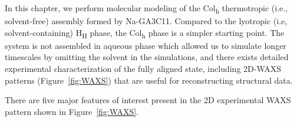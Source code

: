 % 
  In this chapter, we perform molecular modeling of the Col\textsubscript{h}
  thermotropic (i.e., solvent-free) assembly formed by Na-GA3C11. Compared to the
  lyotropic (i.e, solvent-containing) H\textsubscript{II} phase, the
  Col\textsubscript{h} phase is a simpler starting point. The system is not
  assembled in aqueous phase which allowed us to simulate longer timescales by
  omitting the solvent in the simulations, and there exists detailed experimental
  characterization of the fully aligned state, including 2D-WAXS patterns
  (Figure~\ref{fig:WAXS}) that are useful for reconstructing structural data. 
  
  There are five major features of interest present in the 2D experimental
  WAXS pattern shown in Figure~\ref{fig:WAXS}.

